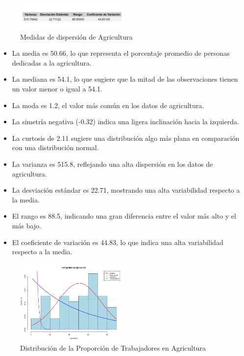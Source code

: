 \documentclass{article}
\begin{document}
\begin{figure}[H]
    \centering
    \includegraphics[width=0.5\textwidth]{Swiss/Agriculture_dispersion.png}
    \caption{Medidas de dispersión de Agricultura}
\end{figure}
\begin{itemize}
    \item La media es 50.66, lo que representa el porcentaje promedio de personas dedicadas a la agricultura.
       \item La mediana es 54.1, lo que sugiere que la mitad de las observaciones tienen un valor menor o igual a 54.1.
       \item La moda es 1.2, el valor más común en los datos de agricultura.
       \item La simetría negativa (-0.32) indica una ligera inclinación hacia la izquierda.
       \item La curtosis de 2.11 sugiere una distribución algo más plana en comparación con una distribución normal.
       \item La varianza es 515.8, reflejando una alta dispersión en los datos de agricultura.
       \item La desviación estándar es 22.71, mostrando una alta variabilidad respecto a la media.
       \item El rango es 88.5, indicando una gran diferencia entre el valor más alto y el más bajo.
       \item El coeficiente de variación es 44.83, lo que indica una alta variabilidad respecto a la media.
   \end{itemize}


       \begin{figure}[H]
        \centering
        \includegraphics[width=0.5\textwidth]{Histogramas/histogram_agriculture.png}
        \caption{Distribución de la Proporción de Trabajadores en Agricultura}
        \end{figure}
   
\end{document}
